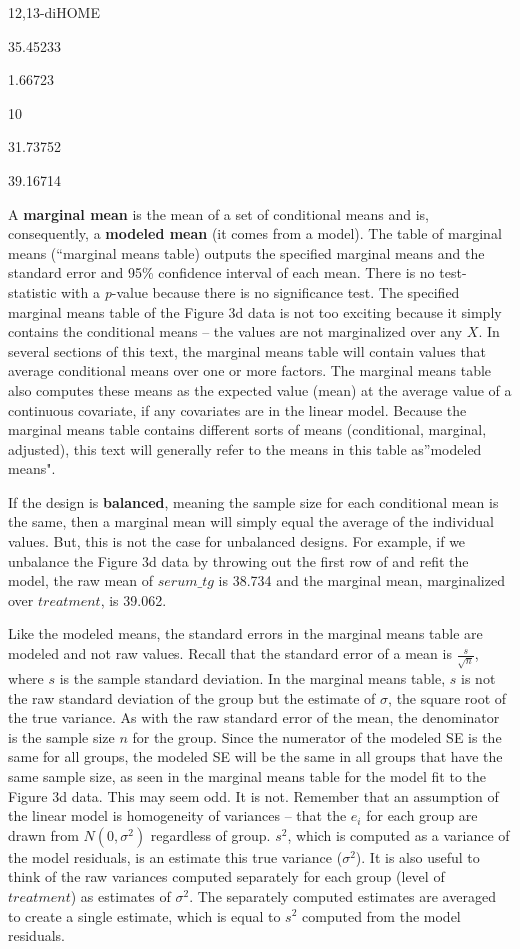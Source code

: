 \documentclass[]{book}
\begin{document}
12,13-diHOME

35.45233

1.66723

10

31.73752

39.16714

A \textbf{marginal mean} is the mean of a set of conditional means and is, consequently, a \textbf{modeled mean} (it comes from a model). The table of marginal means (``marginal means table) outputs the specified marginal means and the standard error and 95\% confidence interval of each mean. There is no test-statistic with a \emph{p}-value because there is no significance test. The specified marginal means table of the Figure 3d data is not too exciting because it simply contains the conditional means -- the values are not marginalized over any \(X\). In several sections of this text, the marginal means table will contain values that average conditional means over one or more factors. The marginal means table also computes these means as the expected value (mean) at the average value of a continuous covariate, if any covariates are in the linear model. Because the marginal means table contains different sorts of means (conditional, marginal, adjusted), this text will generally refer to the means in this table as''modeled means".

If the design is \textbf{balanced}, meaning the sample size for each conditional mean is the same, then a marginal mean will simply equal the average of the individual values. But, this is not the case for unbalanced designs. For example, if we unbalance the Figure 3d data by throwing out the first row of and refit the model, the raw mean of \(serum\_tg\) is 38.734 and the marginal mean, marginalized over \(treatment\), is 39.062.

Like the modeled means, the standard errors in the marginal means table are modeled and not raw values. Recall that the standard error of a mean is \(\frac{s}{\sqrt{n}}\), where \(s\) is the sample standard deviation. In the marginal means table, \(s\) is not the raw standard deviation of the group but the estimate of \(\sigma\), the square root of the true variance. As with the raw standard error of the mean, the denominator is the sample size \(n\) for the group. Since the numerator of the modeled SE is the same for all groups, the modeled SE will be the same in all groups that have the same sample size, as seen in the marginal means table for the model fit to the Figure 3d data. This may seem odd. It is not. Remember that an assumption of the linear model is homogeneity of variances -- that the \(e_i\) for each group are drawn from \(N(0, \sigma^2)\) regardless of group. \(s^2\), which is computed as a variance of the model residuals, is an estimate this true variance (\(\sigma^2\)). It is also useful to think of the raw variances computed separately for each group (level of \(treatment\)) as estimates of \(\sigma^2\). The separately computed estimates are averaged to create a single estimate, which is equal to \(s^2\) computed from the model residuals.
\end{document}
